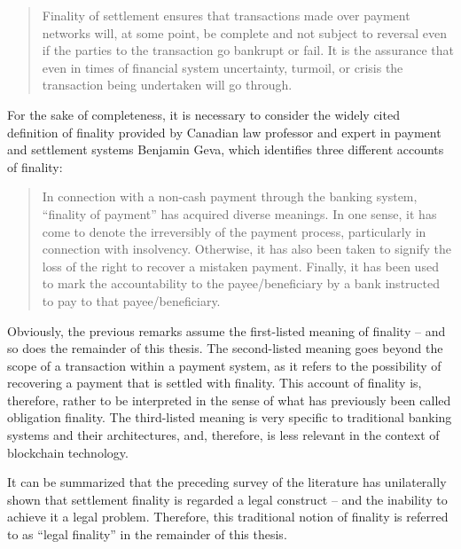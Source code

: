 \begin{quote}
	Finality of settlement ensures that transactions made over payment networks will, at some point, be complete and not subject to reversal even if the parties to the transaction go bankrupt or fail.
	It is the assurance that even in times of financial system uncertainty, turmoil, or crisis the transaction being undertaken will go through.
\end{quote}

For the sake of completeness, it is necessary to consider the widely cited definition of finality provided by Canadian law professor and expert in payment and settlement systems Benjamin Geva, which identifies three different accounts of finality: \autocite[633, 634]{geva2008}

\begin{quote}
	In connection with a non-cash payment through the banking system, ``finality of payment'' has acquired diverse meanings.
	In one sense, it has come to denote the irreversibly of the payment process, particularly in connection with insolvency.
	Otherwise, it has also been taken to signify the loss of the right to recover a mistaken payment.
	Finally, it has been used to mark the accountability to the payee/beneficiary by a bank instructed to pay to that payee/beneficiary. 
\end{quote}

Obviously, the previous remarks assume the first-listed meaning of finality -- and so does the remainder of this thesis.
The second-listed meaning goes beyond the scope of a transaction within a payment system, as it refers to the possibility of recovering a payment that is settled with finality.
This account of finality is, therefore, rather to be interpreted in the sense of what has previously been called obligation finality.
The third-listed meaning is very specific to traditional banking systems and their architectures, and, therefore, is less relevant in the context of blockchain technology.

It can be summarized that the preceding survey of the literature has unilaterally shown that settlement finality is regarded a legal construct -- and the inability to achieve it a legal problem.
Therefore, this traditional notion of finality is referred to as ``legal finality'' in the remainder of this thesis.

